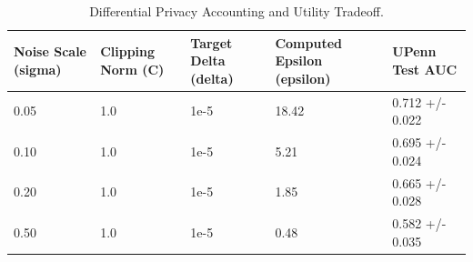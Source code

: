 \begin{table}
\caption{Differential Privacy Accounting and Utility Tradeoff.}
\label{tab:table3}
\begin{tabular}{lllll}
\toprule
Noise Scale (sigma) & Clipping Norm (C) & Target Delta (delta) & Computed Epsilon (epsilon) & UPenn Test AUC \\
\midrule
0.05 & 1.0 & 1e-5 & 18.42 & 0.712 +/- 0.022 \\
0.10 & 1.0 & 1e-5 & 5.21 & 0.695 +/- 0.024 \\
0.20 & 1.0 & 1e-5 & 1.85 & 0.665 +/- 0.028 \\
0.50 & 1.0 & 1e-5 & 0.48 & 0.582 +/- 0.035 \\
\bottomrule
\end{tabular}
\end{table}
